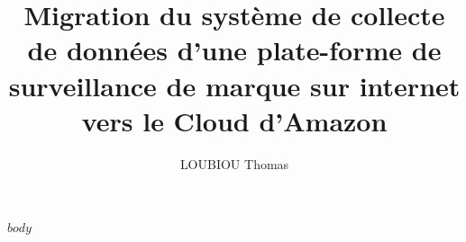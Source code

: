 \documentclass[12pt]{report}
\begin{document}


   \title{Migration du système de collecte de données d'une plate-forme de surveillance de marque sur internet vers le Cloud d'Amazon}
   \author{LOUBIOU Thomas}
   \maketitle
   \tableofcontents
   \thispagestyle{empty} %

   \setcounter{page}{0}


  $body$
\end{document}
